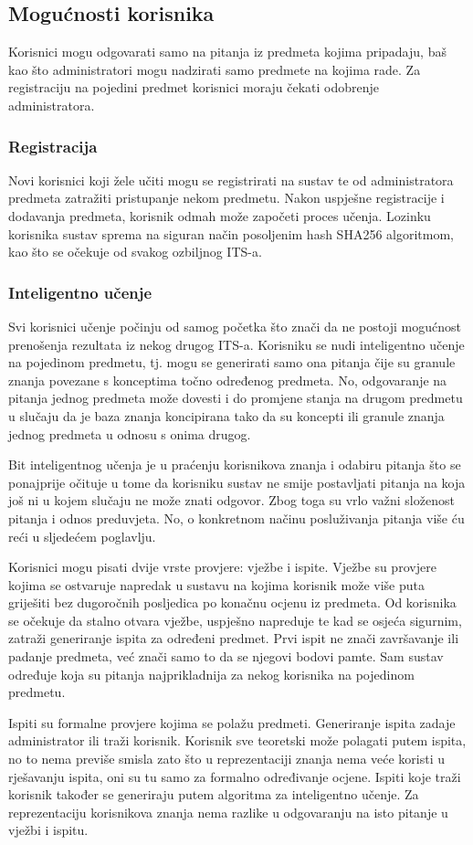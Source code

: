 \documentclass[times, utf8, zavrsni, numeric]{fer}
\begin{document}
\subsection{Mogućnosti korisnika}
Korisnici mogu odgovarati samo na pitanja iz predmeta kojima pripadaju, baš kao što administratori mogu nadzirati samo predmete na kojima rade. Za registraciju na pojedini predmet korisnici moraju čekati odobrenje administratora.

\subsubsection{Registracija}
Novi korisnici koji žele učiti mogu se registrirati na sustav te od administratora predmeta zatražiti pristupanje nekom predmetu. Nakon uspješne registracije i dodavanja predmeta, korisnik odmah može započeti proces učenja. Lozinku korisnika sustav sprema na siguran način posoljenim hash SHA256 algoritmom, kao što se očekuje od svakog ozbiljnog ITS-a.

\subsubsection{Inteligentno učenje}
Svi korisnici učenje počinju od samog početka što znači da ne postoji mogućnost prenošenja rezultata iz nekog drugog ITS-a. Korisniku se nudi inteligentno učenje na pojedinom predmetu, tj. mogu se generirati samo ona pitanja čije su granule znanja povezane s konceptima točno određenog predmeta. No, odgovaranje na pitanja jednog predmeta može dovesti i do promjene stanja na drugom predmetu u slučaju da je baza znanja koncipirana tako da su koncepti ili granule znanja jednog predmeta u odnosu s onima drugog.
\par
Bit inteligentnog učenja je u praćenju korisnikova znanja i odabiru pitanja što se ponajprije očituje u tome da korisniku sustav ne smije postavljati pitanja na koja još ni u kojem slučaju ne može  znati odgovor. Zbog toga su vrlo važni složenost pitanja i odnos preduvjeta. No, o konkretnom načinu posluživanja pitanja više ću reći u sljedećem poglavlju.
\par
Korisnici mogu pisati dvije vrste provjere: vježbe i ispite. Vježbe su provjere kojima se ostvaruje napredak u sustavu na kojima korisnik može više puta griješiti bez dugoročnih posljedica po konačnu ocjenu iz predmeta. Od korisnika se očekuje da stalno otvara vježbe, uspješno napreduje te kad se osjeća sigurnim, zatraži generiranje ispita za određeni predmet. Prvi ispit ne znači završavanje ili padanje predmeta, već znači samo to da se njegovi bodovi pamte. Sam sustav određuje koja su pitanja najprikladnija za nekog korisnika na pojedinom predmetu. 
\par
Ispiti su formalne provjere kojima se polažu predmeti. Generiranje ispita zadaje administrator ili traži korisnik. Korisnik sve teoretski može polagati putem ispita, no to nema previše smisla zato što u reprezentaciji znanja nema veće koristi u rješavanju ispita, oni su tu samo za formalno određivanje ocjene. Ispiti koje traži korisnik također se generiraju putem algoritma za inteligentno učenje. Za reprezentaciju korisnikova znanja nema razlike u odgovaranju na isto pitanje u vježbi i ispitu.
\end{document}
